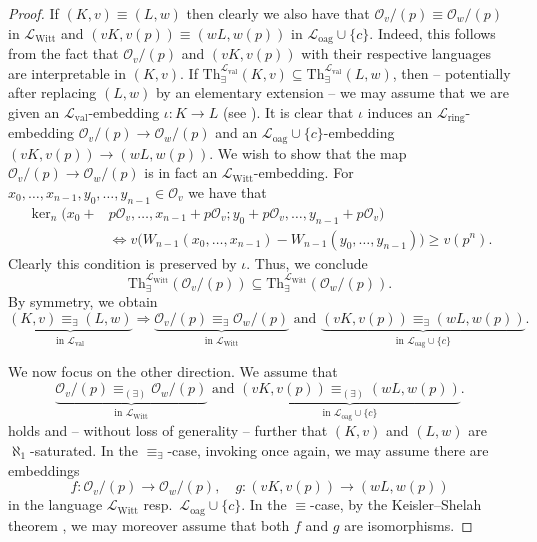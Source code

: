 \documentclass[a4paper]{amsart}
\theoremstyle{mystyle2}
\theoremstyle{mystyle}
\renewcommand{\L}{\mathcal{L}}
\newcommand{\Lring}{\L_{\mathrm{ring}}}
\newcommand{\Loag}{\L_{\mathrm{oag}}}
\newcommand{\Lval}{\L_{\mathrm{val}}}
\newcommand{\LWitt}{\L_{\mathrm{Witt}}}
\renewcommand{\O}{\mathcal{O}}
\numberwithin{equation}{section}
\begin{document}
    \begin{proof}
        If $(K,v)\equiv (L, w)$ then clearly we also have that $\O_v/(p) \equiv \O_w/(p)$ in $\LWitt$ and $(vK, v(p))\equiv (wL, w(p))$ in $\Loag\cup\{c\}$.
        Indeed, this follows from the fact that $\O_v/(p)$ and $(vK, v(p))$ with their respective languages are interpretable in $(K,v)$.
        If $\mathrm{Th}_\exists^{\Lval}{(K,v)} \subseteq \mathrm{Th}_\exists^{\Lval} (L,w)$, then -- potentially after replacing $(L,w)$ by an elementary extension -- we may assume that we are given an $\Lval$-embedding $\iota\colon K\to L$ (see \cite[Proposition 5.2.2]{CK}).
        It is clear that $\iota$ induces an $\Lring$-embedding $\O_v/(p)\to \O_w/(p)$ and an $\Loag\cup\{c\}$-embedding $(vK, v(p))\to (wL, w(p))$.
        We wish to show that the map $\O_v/(p)\to \O_w/(p)$ is in fact an $\LWitt$-embedding.
        For $x_0, \ldots, x_{n-1}, y_0, \ldots, y_{n-1}\in \O_v$ we have that
        \begin{align*}
        \ker_n(x_0+& p\O_v, \ldots, x_{n-1}+p\O_v; y_0+p\O_v, \ldots, y_{n-1}+p\O_v) \\
        &\Longleftrightarrow v\big(W_{n-1}(x_0, \ldots, x_{n-1}) - W_{n-1}(y_0, \ldots, y_{n-1})\big) \geq v(p^n).    
        \end{align*}
        Clearly this condition is preserved by $\iota$.
        Thus, we conclude $$\mathrm{Th}_\exists^{\LWitt}(\O_v/(p))\subseteq \mathrm{Th}_{\exists}^{\LWitt}(\O_w/(p)).$$
        By symmetry, we obtain
        $$\underbrace{(K,v) \equiv_\exists (L,w)}_{\text{in }\mathcal{L}_\mathrm{val}} \Longrightarrow \underbrace{\mathcal{O}_v/(p) \equiv_\exists \mathcal{O}_w/(p)}_{\text{in }\mathcal{L}_{\mathrm{Witt}}}\textrm{ and } \underbrace{(vK,v(p)) \equiv_\exists (wL,w(p))}_{\text{in }\mathcal{L}_{\mathrm{oag}}\cup\{c\}}.$$
        
        We now focus on the other direction. We assume that 
        $$
        \underbrace{\mathcal{O}_v/(p) \equiv_{(\exists)} \mathcal{O}_w/(p)}_{\text{in }\mathcal{L}_{\mathrm{Witt}}}\textrm{ and } \underbrace{(vK,v(p)) \equiv_{(\exists)} (wL,w(p))}_{\text{in }\mathcal{L}_{\mathrm{oag}}\cup\{c\}}.$$
        holds and -- without loss of generality -- further 
        that $(K,v)$ and $(L,w)$ are $\aleph_1$-saturated.
        In the $\equiv_\exists$-case, invoking \cite[Proposition 5.2.2]{CK} once again,
        we may assume there are embeddings
        \[
        f\colon \O_v/(p)\to \O_w/(p), \quad g\colon (vK, v(p))\to (wL, w(p))
        \]
        in the language $\LWitt$ resp.\ $\Loag\cup\{c\}$.
        In the $\equiv$-case, by the Keisler--Shelah theorem \cite[Theorem 6.1.15]{CK}, we may moreover assume that both
        $f$ and $g$ are isomorphisms.


\end{proof}
\end{document}
